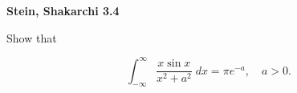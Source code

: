 \textbf{Stein, Shakarchi 3.4}

Show that

$$
\int_{-\infty}^{\infty} {\frac{x \sin x}{x^2 + a^2}} \; dx = \pi e^{-a}, \quad a > 0.
$$

\begin{solution}
  \ \\
\end{solution}